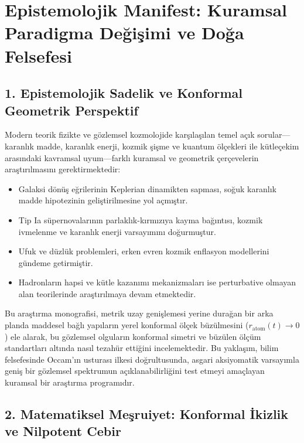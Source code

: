 \section*{Epistemolojik Manifest: Kuramsal Paradigma Değişimi ve Doğa Felsefesi}
\label{sec:epistemolojik_manifest}

\subsection*{1. Epistemolojik Sadelik ve Konformal Geometrik Perspektif}

Modern teorik fizikte ve gözlemsel kozmolojide karşılaşılan temel açık sorular—karanlık madde, karanlık enerji, kozmik şişme ve kuantum ölçekleri ile kütleçekim arasındaki kavramsal uyum—farklı kuramsal ve geometrik çerçevelerin araştırılmasını gerektirmektedir:
\begin{itemize}
    \item Galaksi dönüş eğrilerinin Keplerian dinamikten sapması, soğuk karanlık madde hipotezinin geliştirilmesine yol açmıştır.
    \item Tip Ia süpernovalarının parlaklık-kırmızıya kayma bağıntısı, kozmik ivmelenme ve karanlık enerji varsayımını doğurmuştur.
    \item Ufuk ve düzlük problemleri, erken evren kozmik enflasyon modellerini gündeme getirmiştir.
    \item Hadronların hapsi ve kütle kazanımı mekanizmaları ise perturbative olmayan alan teorilerinde araştırılmaya devam etmektedir.
\end{itemize}

Bu araştırma monografisi, metrik uzay genişlemesi yerine durağan bir arka planda maddesel bağlı yapıların yerel konformal ölçek büzülmesini ($r_{\mathrm{atom}}(t) \to 0$) ele alarak, bu gözlemsel olguların konformal simetri ve büzülen ölçüm standartları altında nasıl tezahür ettiğini incelemektedir. Bu yaklaşım, bilim felsefesinde Occam'ın usturası ilkesi doğrultusunda, asgari aksiyomatik varsayımla geniş bir gözlemsel spektrumun açıklanabilirliğini test etmeyi amaçlayan kuramsal bir araştırma programıdır.

\subsection*{2. Matematiksel Meşruiyet: Konformal İkizlik ve Nilpotent Cebir}


